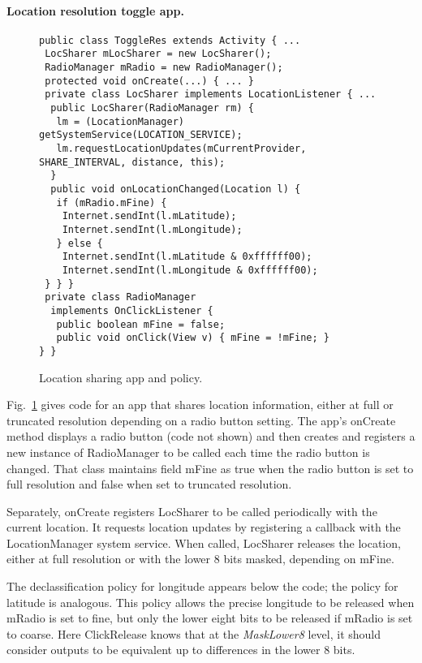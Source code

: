 \documentclass{llncs}
\newcommand{\code}[1]{\textsf{#1}} \newcommand{\bcode}[1]{\texttt{#1}}
\newcommand{\toolname}{ClickRelease\xspace}
\begin{document}
\paragraph*{Location resolution toggle app.}

\begin{figure}[t]
\centering
\begin{lstlisting}[name=Ex]
public class ToggleRes extends Activity { ...
 LocSharer mLocSharer = new LocSharer();
 RadioManager mRadio = new RadioManager();
 protected void onCreate(...) { ... }
 private class LocSharer implements LocationListener { ... 
  public LocSharer(RadioManager rm) {
   lm = (LocationManager) getSystemService(LOCATION_SERVICE);
   lm.requestLocationUpdates(mCurrentProvider, SHARE_INTERVAL, distance, this);
  }
  public void onLocationChanged(Location l) {
   if (mRadio.mFine) {
    Internet.sendInt(l.mLatitude);
    Internet.sendInt(l.mLongitude);
   } else {
    Internet.sendInt(l.mLatitude & 0xffffff00);
    Internet.sendInt(l.mLongitude & 0xffffff00);
 } } }
 private class RadioManager
  implements OnClickListener {
   public boolean mFine = false;
   public void onClick(View v) { mFine = !mFine; }
} }
\end{lstlisting}
  
\caption{Location sharing app and policy.}
\label{fig:app-loc-toggle}
\end{figure}

Fig.~\ref{fig:app-loc-toggle} gives code for an app that
shares location information, either at full or truncated resolution
depending on a radio button setting. The app's \code{onCreate}
method displays a radio button (code not shown) and then creates and
registers a new instance of \code{RadioManager} to be called
each time the radio button is changed. That
class maintains field \code{mFine} as \code{true} when the radio button is
set to full resolution and \code{false} when set to truncated
resolution.

Separately, \code{onCreate} registers \code{LocSharer} to be called
periodically with the current location.  It requests location updates
by registering a callback with the \code{LocationManager}
system service.  When called, \code{LocSharer} releases the
location, either at full resolution or with the lower 8 bits
masked, depending on \code{mFine}.

The declassification policy for longitude appears below the code; the
policy for latitude is analogous.  This policy allows the precise
longitude to be released when
\code{mRadio} is set to fine, but only the lower eight bits to
be released if \code{mRadio} is set to coarse. Here \toolname{}
knows that at the \textit{MaskLower8} level, it should consider
outputs to be equivalent up to differences in the lower 8
bits. 
\end{document}
